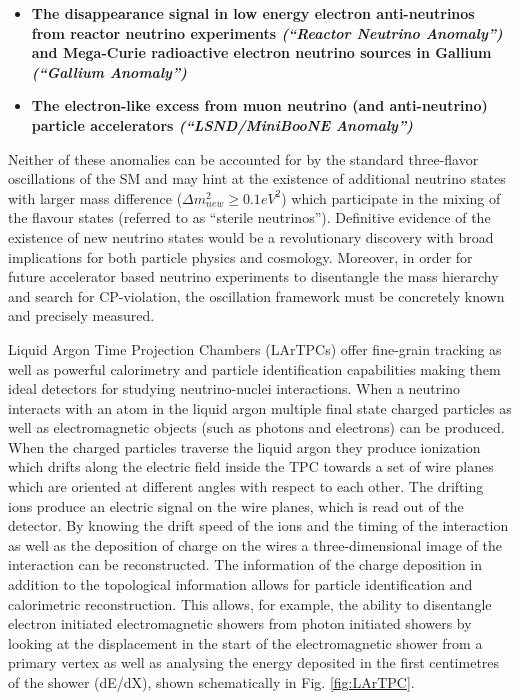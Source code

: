 \begin{itemize}
\item \textbf{The disappearance signal in low energy electron anti-neutrinos from reactor neutrino experiments \cite{No13} \textit{(``Reactor Neutrino Anomaly'')} and Mega-Curie radioactive electron neutrino sources in Gallium \cite{No14, No15} \textit{(``Gallium Anomaly'')}}

\item \textbf{The electron-like excess from muon neutrino (and anti-neutrino) particle accelerators \textit{(``LSND/MiniBooNE Anomaly'')} \cite{No16, No17}}

\end{itemize}

Neither of these anomalies can be accounted for by the standard three-flavor oscillations of the SM and may hint at the existence of additional neutrino states with larger mass difference ($\Delta m_{new}^{2}\geq 0.1 eV^{2}$) which participate in the mixing of the flavour states (referred to as ``sterile neutrinos''). Definitive evidence of the existence of new neutrino states would be a revolutionary discovery with broad implications for both particle physics and cosmology. Moreover, in order for future accelerator based neutrino experiments to disentangle the mass hierarchy and search for CP-violation, the oscillation framework must be concretely known and precisely measured.

Liquid Argon Time Projection Chambers (LArTPCs) offer fine-grain tracking as well as powerful calorimetry and particle identification capabilities making them ideal detectors for studying neutrino-nuclei interactions. When a neutrino interacts with an atom in the liquid argon multiple final state charged particles as well as electromagnetic objects (such as photons and electrons) can be produced. When the charged particles traverse the liquid argon they produce ionization which drifts along the electric field inside the TPC towards a set of wire planes which are oriented at different angles with respect to each other. The drifting ions produce an electric signal on the wire planes, which is read out of the detector. By knowing the drift speed of the ions and the timing of the interaction as well as the deposition of charge on the wires a three-dimensional image of the interaction can be reconstructed. The information of the charge deposition in addition to the topological information allows for particle identification and calorimetric reconstruction. This allows, for example, the ability to disentangle electron initiated electromagnetic showers from photon initiated showers by looking at the displacement in the start of the electromagnetic shower from a primary vertex as well as analysing the energy deposited in the first centimetres of the shower (dE/dX), shown schematically in Fig. \ref{fig:LArTPC}.


